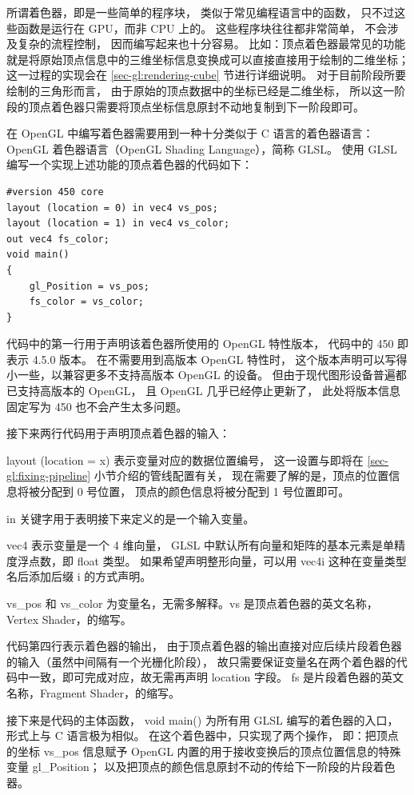 \documentclass[fontset=windows]{ctexart}
\begin{document}
所谓着色器，即是一些简单的程序块，
类似于常见编程语言中的函数，
只不过这些函数是运行在 GPU，而非 CPU 上的。
这些程序块往往都非常简单，
不会涉及复杂的流程控制，
因而编写起来也十分容易。
比如：顶点着色器最常见的功能就是将原始顶点信息中的三维坐标信息变换成可以直接直接用于绘制的二维坐标；
这一过程的实现会在 \ref{sec-gl:rendering-cube} 节进行详细说明。
对于目前阶段所要绘制的三角形而言，
由于原始的顶点数据中的坐标已经是二维坐标，
所以这一阶段的顶点着色器只需要将顶点坐标信息原封不动地复制到下一阶段即可。

在 OpenGL 中编写着色器需要用到一种十分类似于 C 语言的着色器语言：
OpenGL 着色器语言（OpenGL Shading Language），简称 GLSL。
使用 GLSL 编写一个实现上述功能的顶点着色器的代码如下：

\begin{lstlisting}
#version 450 core
layout (location = 0) in vec4 vs_pos;
layout (location = 1) in vec4 vs_color;
out vec4 fs_color;
void main()
{
    gl_Position = vs_pos;
    fs_color = vs_color;
}
\end{lstlisting}

代码中的第一行用于声明该着色器所使用的 OpenGL 特性版本，
代码中的 450 即表示 4.5.0 版本。
在不需要用到高版本 OpenGL 特性时，
这个版本声明可以写得小一些，以兼容更多不支持高版本 OpenGL 的设备。
但由于现代图形设备普遍都已支持高版本的 OpenGL，
且 OpenGL 几乎已经停止更新了，
此处将版本信息固定写为 450 也不会产生太多问题。

接下来两行代码用于声明顶点着色器的输入：

layout (location = x) 表示变量对应的数据位置编号，
这一设置与即将在 \ref{sec-gl:fixing-pipeline} 小节介绍的管线配置有关，
现在需要了解的是，顶点的位置信息将被分配到 0 号位置，
顶点的颜色信息将被分配到 1 号位置即可。

in 关键字用于表明接下来定义的是一个输入变量。

vec4 表示变量是一个 4 维向量，
GLSL 中默认所有向量和矩阵的基本元素是单精度浮点数，即 float 类型。
如果希望声明整形向量，可以用 vec4i 这种在变量类型名后添加后缀 i 的方式声明。

vs\_pos 和 vs\_color 为变量名，无需多解释。vs 是顶点着色器的英文名称，Vertex Shader，的缩写。

代码第四行表示着色器的输出，
由于顶点着色器的输出直接对应后续片段着色器的输入（虽然中间隔有一个光栅化阶段），
故只需要保证变量名在两个着色器的代码中一致，即可完成对应，故无需再声明 location 字段。
fs 是片段着色器的英文名称，Fragment Shader，的缩写。

接下来是代码的主体函数，
void main() 为所有用 GLSL 编写的着色器的入口，
形式上与 C 语言极为相似。
在这个着色器中，只实现了两个操作，
即：把顶点的坐标 vs\_pos 信息赋予 OpenGL 内置的用于接收变换后的顶点位置信息的特殊变量 gl\_Position；
以及把顶点的颜色信息原封不动的传给下一阶段的片段着色器。
\end{document}
